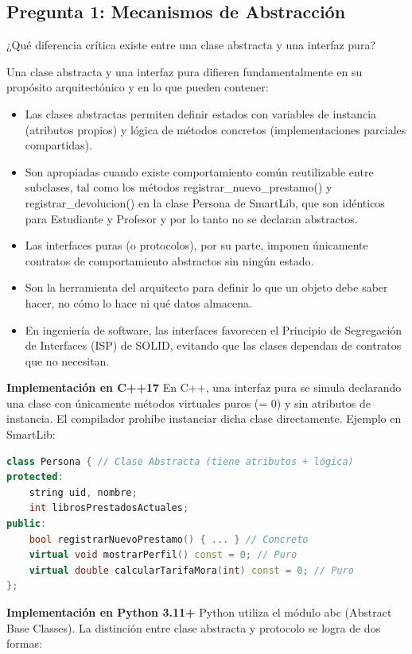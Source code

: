 \documentclass[12pt,a4paper]{article}
\begin{document}
\subsection{Pregunta 1: Mecanismos de Abstracción}
¿Qué diferencia crítica existe entre una clase abstracta y una interfaz pura?

Una clase abstracta y una interfaz pura difieren fundamentalmente en su propósito arquitectónico y en lo que pueden contener:
\begin{itemize}
    \item Las clases abstractas permiten definir estados con variables de instancia (atributos propios) y lógica de métodos concretos (implementaciones parciales compartidas).
    \item Son apropiadas cuando existe comportamiento común reutilizable entre subclases, tal como los métodos registrar\_nuevo\_prestamo() y registrar\_devolucion() en la clase Persona de SmartLib, que son idénticos para Estudiante y Profesor y por lo tanto no se declaran abstractos.
    \item Las interfaces puras (o protocolos), por su parte, imponen únicamente contratos de comportamiento abstractos sin ningún estado.
    \item Son la herramienta del arquitecto para definir lo que un objeto debe saber hacer, no cómo lo hace ni qué datos almacena.
    \item En ingeniería de software, las interfaces favorecen el Principio de Segregación de Interfaces (ISP) de SOLID, evitando que las clases dependan de contratos que no necesitan.
\end{itemize}

\textbf{Implementación en C++17}
En C++, una interfaz pura se simula declarando una clase con únicamente métodos virtuales puros (= 0) y sin atributos de instancia. El compilador prohíbe instanciar dicha clase directamente. Ejemplo en SmartLib:

\begin{lstlisting}[language=C++]
class Persona { // Clase Abstracta (tiene atributos + lógica)
protected:
    string uid, nombre;
    int librosPrestadosActuales;
public:
    bool registrarNuevoPrestamo() { ... } // Concreto
    virtual void mostrarPerfil() const = 0; // Puro
    virtual double calcularTarifaMora(int) const = 0; // Puro
};
\end{lstlisting}

\textbf{Implementación en Python 3.11+}
Python utiliza el módulo abc (Abstract Base Classes). La distinción entre clase abstracta y protocolo se logra de dos formas:
\end{document}
